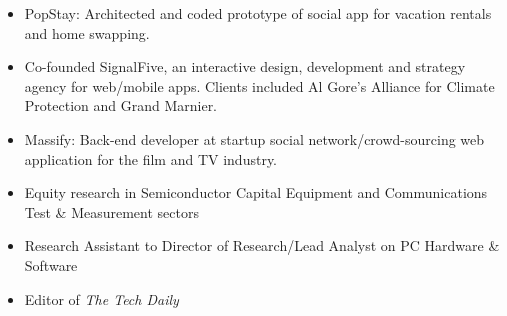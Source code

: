 \documentclass[a4paper,10pt]{memoir} %
\begin{document}
\begin{itemize}
	\item PopStay: Architected and coded prototype of social app for vacation rentals and home swapping.
	\item Co-founded SignalFive, an interactive design, development and strategy agency for web/mobile apps. Clients included Al Gore's Alliance for Climate Protection and Grand Marnier. 
	\item Massify: Back-end developer at startup social network/crowd-sourcing web application for the film and TV industry.
\end{itemize}
\Sep %

\clearpage %
\userinformation %
\framebreak %



\begin{itemize}
	\item Equity research in Semiconductor Capital Equipment and Communications Test \& Measurement sectors
\end{itemize}
\Sep %

\begin{itemize}
	\item Research Assistant to Director of Research/Lead Analyst on PC Hardware \& Software 
	\item Editor of \textit{The Tech Daily}
\end{itemize}

\Sep %



\end{document}
